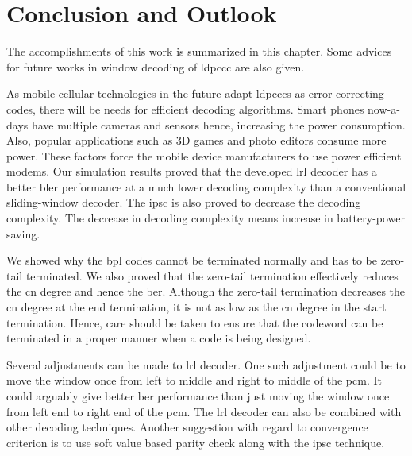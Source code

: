 \chapter{Conclusion and Outlook}\label{ch:conclu}
The accomplishments of this work is summarized in this chapter. Some advices for future works in window decoding of \gls{ldpccc} are also given.

As mobile cellular technologies in the future adapt \glspl{ldpccc} as error-correcting codes, there will be needs for efficient decoding algorithms. Smart phones now-a-days have multiple cameras and sensors hence, increasing the power consumption. Also, popular applications such as 3D games and photo editors consume more power. These factors force the mobile device manufacturers to use power efficient modems. Our simulation results proved that the developed \acrfull{lrl} decoder has a better \acrfull{bler} performance at a much lower decoding complexity than a conventional sliding-window decoder. The \acrfull{ipsc} is also proved to decrease the decoding complexity. The decrease in decoding complexity means increase in battery-power saving.

We showed why the \gls{bpl} codes cannot be terminated normally and has to be zero-tail terminated. We also proved that the zero-tail termination effectively reduces the \gls{cn} degree and hence the \acrfull{ber}. Although the zero-tail termination decreases the \gls{cn} degree at the end termination, it is not as low as the \gls{cn} degree in the start termination. Hence, care should be taken to ensure that the codeword can be terminated in a proper manner when a code is being designed.

Several adjustments can be made to \gls{lrl} decoder. One such adjustment could be to move the window once from left to middle and right to middle of the \gls{pcm}. It could arguably give better \gls{ber} performance than just moving the window once from left end to right end of the \gls{pcm}. The \gls{lrl} decoder can also be combined with other decoding techniques. Another suggestion with regard to convergence criterion is to use soft value based parity check along with the \gls{ipsc} technique.